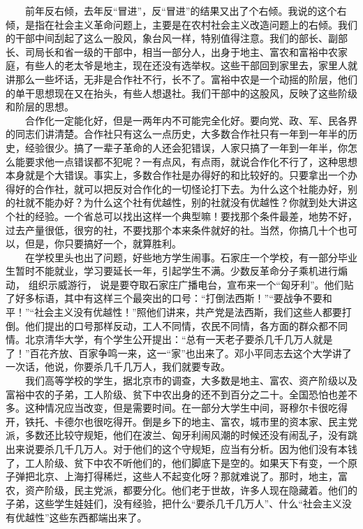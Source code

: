 \documentclass[cn,11pt,chinese]{elegantbook}
\begin{document}
　　前年反右倾，去年反“冒进”，反“冒进”的结果又出了个右倾。我说的这个右倾，是指在社会主义革命问题上，主要是在农村社会主义改造问题上的右倾。我们的干部中间刮起了这么一股风，象台风一样，特别值得注意。我们的部长、副部长、司局长和省一级的干部中，相当一部分人，出身于地主、富农和富裕中农家庭，有些人的老太爷是地主，现在还没有选举权。这些干部回到家里去，家里人就讲那么一些坏话，无非是合作社不行，长不了。富裕中农是一个动摇的阶层，他们的单干思想现在又在抬头，有些人想退社。我们干部中的这股风，反映了这些阶级和阶层的思想。\\
　　合作化一定能化好，但是一两年内不可能完全化好。要向党、政、军、民各界的同志们讲清楚。合作社只有这么一点历史，大多数合作社只有一年到一年半的历史，经验很少。搞了一辈子革命的人还会犯错误，人家只搞了一年到一年半，你怎么能要求他一点错误都不犯呢？一有点风，有点雨，就说合作化不行了，这种思想本身就是个大错误。事实上，多数合作社是办得好的和比较好的。只要拿出一个办得好的合作社，就可以把反对合作化的一切怪论打下去。为什么这个社能办好，别的社就不能办好？为什么这个社有优越性，别的社就没有优越性？你就到处大讲这个社的经验。一个省总可以找出这样一个典型嘛！要找那个条件最差，地势不好，过去产量很低，很穷的社，不要找那个本来条件就好的社。当然，你搞几十个也可以，但是，你只要搞好一个，就算胜利。\\
　　在学校里头也出了问题，好些地方学生闹事。石家庄一个学校，有一部分毕业生暂时不能就业，学习要延长一年，引起学生不满。少数反革命分子乘机进行煽动， 组织示威游行， 说是要夺取石家庄广播电台，宣布来一个“匈牙利”。他们贴了好多标语，其中有这样三个最突出的口号：“打倒法西斯！”“要战争不要和平！”“社会主义没有优越性！”照他们讲来，共产党是法西斯，我们这些人都要打倒。他们提出的口号那样反动，工人不同情，农民不同情，各方面的群众都不同情。北京清华大学，有个学生公开提出：“总有一天老子要杀几千几万人就是了！”百花齐放、百家争鸣一来，这一“家”也出来了。邓小平同志去这个大学讲了一次话，他说，你要杀几千几万人，我们就要专政。\\
　　我们高等学校的学生，据北京市的调查，大多数是地主、富农、资产阶级以及富裕中农的子弟，工人阶级、贫下中农出身的还不到百分之二十。全国恐怕也差不多。这种情况应当改变，但是需要时间。在一部分大学生中间，哥穆尔卡很吃得开，铁托、卡德尔也很吃得开。倒是乡下的地主、富农，城市里的资本家、民主党派，多数还比较守规矩，他们在波兰、匈牙利闹风潮的时候还没有闹乱子，没有跳出来说要杀几千几万人。对于他们的这个守规矩，应当有分析。因为他们没有本钱了，工人阶级、贫下中农不听他们的，他们脚底下是空的。如果天下有变，一个原子弹把北京、上海打得稀烂，这些人不起变化呀？那就难说了。那时，地主，富农，资产阶级，民主党派，都要分化。他们老于世故，许多人现在隐藏着。他们的子弟，这些学生娃娃们，没有经验，把什么“要杀几千几万人”、什么“社会主义没有优越性”这些东西都端出来了。\\
\end{document}
